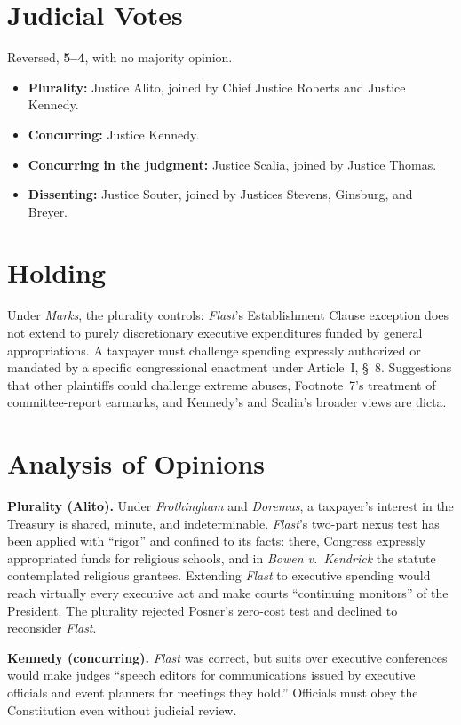 \documentclass[12pt]{article}
\begin{document}
\section{Judicial Votes}

Reversed, \textbf{5--4}, with no majority opinion.
\begin{itemize}
\item \textbf{Plurality:} Justice Alito, joined by Chief Justice Roberts and Justice Kennedy.
\item \textbf{Concurring:} Justice Kennedy.
\item \textbf{Concurring in the judgment:} Justice Scalia, joined by Justice Thomas.
\item \textbf{Dissenting:} Justice Souter, joined by Justices Stevens, Ginsburg, and Breyer.
\end{itemize}

\section{Holding}

Under \textit{Marks}, the plurality controls: \textit{Flast}'s Establishment Clause exception does not extend to purely discretionary executive expenditures funded by general appropriations. A taxpayer must challenge spending expressly authorized or mandated by a specific congressional enactment under Article~I, \S~8. Suggestions that other plaintiffs could challenge extreme abuses, Footnote~7's treatment of committee-report earmarks, and Kennedy's and Scalia's broader views are dicta.

\section{Analysis of Opinions}

\textbf{Plurality (Alito).} Under \textit{Frothingham} and \textit{Doremus}, a taxpayer's interest in the Treasury is shared, minute, and indeterminable. \textit{Flast}'s two-part nexus test has been applied with ``rigor'' and confined to its facts: there, Congress expressly appropriated funds for religious schools, and in \textit{Bowen v.\ Kendrick} the statute contemplated religious grantees. Extending \textit{Flast} to executive spending would reach virtually every executive act and make courts ``continuing monitors'' of the President. The plurality rejected Posner's zero-cost test and declined to reconsider \textit{Flast}.

\textbf{Kennedy (concurring).} \textit{Flast} was correct, but suits over executive conferences would make judges ``speech editors for communications issued by executive officials and event planners for meetings they hold.'' Officials must obey the Constitution even without judicial review.
\end{document}
